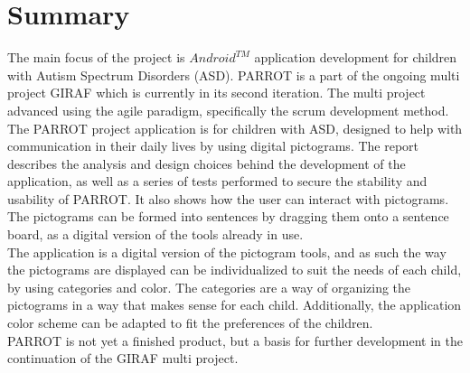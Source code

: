 \chapter*{Summary}

The main focus of the project is $Android^{TM}$ application development for children with Autism Spectrum Disorders (ASD).  PARROT is a part of the ongoing multi project GIRAF which is currently in its second iteration. The multi project advanced using the agile paradigm, specifically the scrum development method.\newline
\\
The PARROT project application is for children with ASD, designed to help with communication in their daily lives by using digital pictograms. The report describes the analysis and design choices behind the development of the application, as well as a series of tests performed to secure the stability and usability of PARROT.  It also shows how the user can interact with pictograms. The pictograms can be formed into sentences by dragging them onto a sentence board, as a digital version of the tools already in use.\newline
\\ 
The application is a digital version of the pictogram tools, and as such the way the pictograms are displayed can be individualized to suit the needs of each child, by using categories and color. The categories are a way of organizing the pictograms in a way that makes sense for each child.  Additionally, the application color scheme can be adapted to fit the preferences of the children. \newline
\\
PARROT is not yet a finished product, but a basis for further development in the continuation of the GIRAF multi project.

